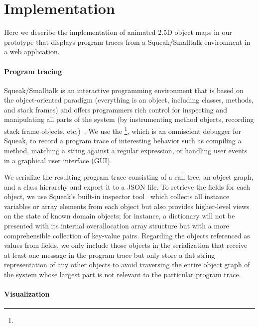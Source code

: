 \section{Implementation}
\label{sec:implementation}

Here we describe the implementation of animated 2.5D object maps in our prototype \tfd{} that displays program traces from a Squeak/Smalltalk environment in a web application.

\paragraph{Program tracing}
\label{sec:implementation/program_tracing}

Squeak/Smalltalk is an interactive programming environment that is based on the object-oriented paradigm (everything is an object, including classes, methods, and stack frames) and offers programmers rich control for inspecting and manipulating all parts of the system (by instrumenting method objects, recording stack frame objects, etc.)~\cite{ingalls1997back,rowledge2001tour,thiede2023squeak}.
We use the \tdb{}\footnote{}, which is an omniscient debugger for Squeak, to record a program trace of interesting behavior such as compiling a method, matching a string against a regular expression, or handling user events in a graphical user interface (GUI).

We serialize the resulting program trace consisting of a call tree, an object graph, and a class hierarchy and export it to a JSON file.
To retrieve the fields for each object, we use Squeak's built-in inspector tool~\cite[chap. 6, sec. 3]{thiede2023squeak} which collects all instance variables or array elements from each object but also provides higher-level views on the state of known domain objects; for instance, a dictionary will not be presented with its internal overallocation array structure but with a more comprehensible collection of key-value pairs.
Regarding the objects referenced as values from fields, we only include those objects in the serialization that receive at least one message in the program trace but only store a flat string representation of any other objects to avoid traversing the entire object graph of the system whose largest part is not relevant to the particular program trace.

\paragraph{Visualization}
\label{sec:implementation/visualization}

